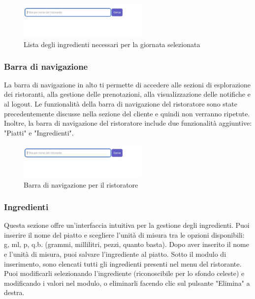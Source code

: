        \begin{figure}[htbp]
            \centering
            \includegraphics[width=0.5625\textwidth]{./img/Dettaglio.jpg}
            \caption{Lista degli ingredienti necessari per la giornata selezionata}
        \end{figure}

    \subsubsection{Barra di navigazione}
    La barra di navigazione in alto ti permette di accedere alle sezioni di esplorazione dei ristoranti, alla gestione delle prenotazioni, alla visualizzazione delle notifiche e al logout. Le funzionalità della barra di navigazione del ristoratore sono state precedentemente discusse nella sezione del cliente e quindi non verranno ripetute. Inoltre, la barra di navigazione del ristoratore include due funzionalità aggiuntive: "Piatti" e "Ingredienti".
        
        \begin{figure}[htbp]
            \centering
            \includegraphics[width=0.5625\textwidth]{./img/Dettaglio.jpg}
            \caption{Barra di navigazione per il ristoratore}
        \end{figure}

    \subsubsection{Ingredienti}
    Questa sezione offre un'interfaccia intuitiva per la gestione degli ingredienti. Puoi inserire il nome del piatto e scegliere l'unità di misura tra le opzioni disponibili: g, ml, p, q.b. (grammi, millilitri, pezzi, quanto basta). Dopo aver inserito il nome e l'unità di misura, puoi salvare l'ingrediente al piatto. Sotto il modulo di inserimento, sono elencati tutti gli ingredienti presenti nel menu del ristorante. Puoi modificarli selezionando l'ingrediente (riconoscibile per lo sfondo celeste) e modificando i valori nel modulo, o eliminarli facendo clic sul pulsante "Elimina" a destra.
    
